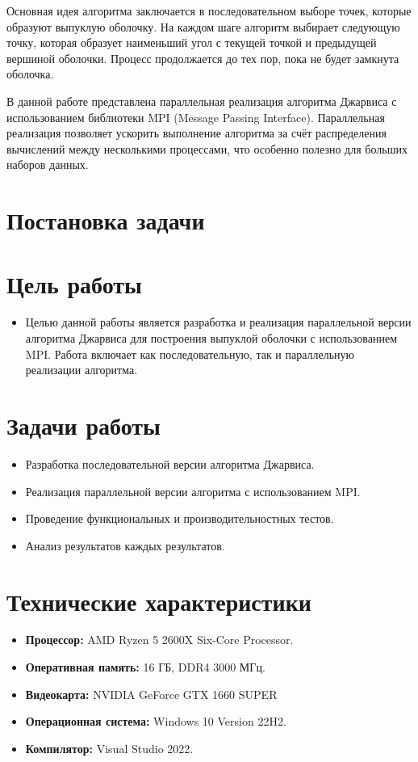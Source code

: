 \documentclass[12pt]{article}
\begin{document}
Основная идея алгоритма заключается в последовательном выборе точек, которые образуют выпуклую оболочку. На каждом шаге алгоритм выбирает следующую точку, которая образует наименьший угол с текущей точкой и предыдущей вершиной оболочки. Процесс продолжается до тех пор, пока не будет замкнута оболочка.

В данной работе представлена параллельная реализация алгоритма Джарвиса с использованием библиотеки MPI (Message Passing Interface). Параллельная реализация позволяет ускорить выполнение алгоритма за счёт распределения вычислений между несколькими процессами, что особенно полезно для больших наборов данных.

\section*{Постановка задачи}

\section*{Цель работы}

\begin{itemize}
\item Целью данной работы является разработка и реализация параллельной версии алгоритма Джарвиса для построения выпуклой оболочки с использованием MPI. Работа включает как последовательную, так и параллельную реализации алгоритма.
\end{itemize}

\section*{Задачи работы}

\begin{itemize}
\item Разработка последовательной версии алгоритма Джарвиса.
\item Реализация параллельной версии алгоритма с использованием MPI.
\item Проведение функциональных и производительностных тестов.
\item Анализ результатов каждых результатов.
\end{itemize}

\section*{Технические характеристики}

\begin{itemize}
\item \textbf{Процессор:} AMD Ryzen 5 2600X Six-Core Processor.
\item \textbf{Оперативная память:} 16 ГБ, DDR4 3000 МГц.
\item \textbf{Видеокарта:} NVIDIA GeForce GTX 1660 SUPER
\item \textbf{Операционная система:} Windows 10 Version 22H2.
\item \textbf{Компилятор:} Visual Studio 2022.
\end{itemize}
\end{document}
